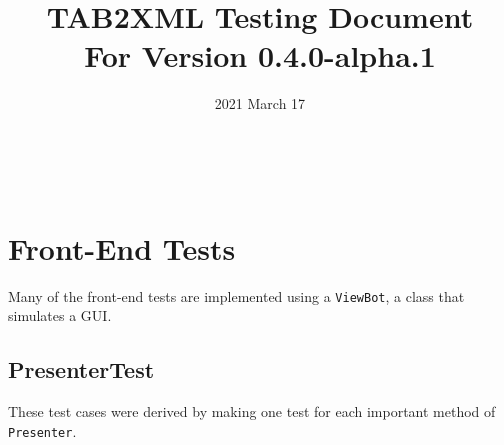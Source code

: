 \documentclass[11pt]{article}
\date{2021 March 17}
\title{TAB2XML Testing Document\\\medskip
\large For Version 0.4.0-alpha.1}
\begin{document}
\maketitle
\tableofcontents

\newpage\\
\section{Front-End Tests}
\label{sec:orgf3e49cb}
Many of the front-end tests are implemented using a \texttt{ViewBot}, a class that simulates a GUI.\\
\subsection{PresenterTest}
\label{sec:orgfd708ed}
These test cases were derived by making one test for each important method of \texttt{Presenter}.\\
\end{document}
